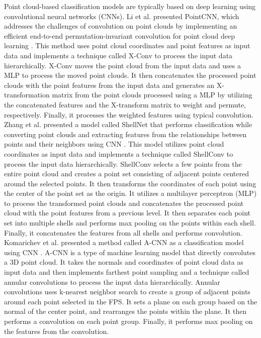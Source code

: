 Point cloud-based classification models are typically based on deep learning using convolutional neural networks (CNNs). 
  Li et al. presented PointCNN, which addresses the challenges of convolution on point clouds by implementing an efficient end-to-end permutation-invariant convolution for point cloud deep learning \cite{NEURIPS2018_f5f8590c}.
    This method uses point cloud coordinates and point features as input data and implements a technique called X-Conv to process the input data hierarchically. 
      X-Conv moves the point cloud from the input data and uses a MLP to process the moved point clouds. 
      It then concatenates the processed point clouds with the point features from the input data and generates an X-transformation matrix from the point clouds processed using a MLP by utilizing the concatenated features and the X-transform matrix to weight and permute, respectively. 
      Finally, it processes the weighted features using typical convolution. 
  Zhang et al. presented a model called ShellNet that performs classification while converting point clouds and extracting features from the relationships between points and their neighbors using CNN \cite{Zhang_2019_ICCV}. 
    This model utilizes point cloud coordinates as input data and implements a technique called ShellConv to process the input data hierarchically. 
      ShellConv selects a few points from the entire point cloud and creates a point set consisting of adjacent points centered around the selected points. 
      It then transforms the coordinates of each point using the center of the point set as the origin. 
      It utilizes a multilayer perceptron (MLP) to process the transformed point clouds and concatenates the processed point cloud with the point features from a previous level. 
      It then separates each point set into multiple shells and performs max pooling on the points within each shell. 
      Finally, it concatenates the features from all shells and performs convolution. 
  Komarichev et al. presented a method called A-CNN as a classification model using CNN \cite{Komarichev_2019_CVPR}. 
    A-CNN is a type of machine learning model that directly convolutes a 3D point cloud. 
    It takes the normals and coordinates of point cloud data as input data and then implements farthest point sampling and a technique called annular convolutions to process the input data hierarchically. 
      Annular convolutions uses k-nearest neighbor search to create a group of adjacent points around each point selected in the FPS. 
      It sets a plane on each group based on the normal of the center point, and rearranges the points within the plane. 
      It then performs a convolution on each point group. 
      Finally, it performs max pooling on the features from the convolution. 


